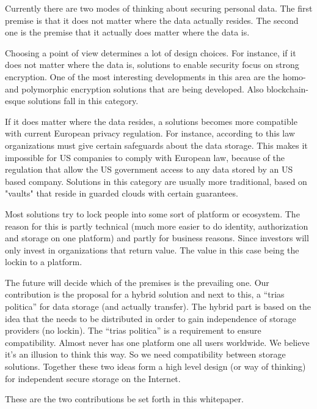 \documentclass{article}
\begin{document}
Currently there are two modes of thinking about securing personal data. The first
premise is that it does not matter where the data actually resides. The second one
is the premise that it actually does matter where the data is.

Choosing a point of view determines a lot of design choices. For instance, if it
does not matter where the data is, solutions to enable security focus on strong
encryption. One of the most interesting developments in this area are the homo- and
polymorphic encryption solutions that are being developed. Also blockchain-esque solutions fall in this category.

If it does matter where the data resides, a solutions becomes more compatible with
current European privacy regulation. For instance, according to this law organizations must give certain safeguards about the data storage. This makes it impossible for US companies to comply with European law, because of the regulation that allow the US government access to any data stored by an US based company. Solutions in this category are usually more traditional, based on "vaults" that reside in guarded clouds with
certain guarantees.

Most solutions try to lock people into some sort of platform or ecosystem. The reason for this is partly technical (much more easier to do identity, authorization and storage on one platform) and partly for business reasons. Since investors will only invest in organizations that return value. The value in this case being the lockin to a platform.

The future will decide which of the premises is the prevailing one. Our contribution
is the proposal for a hybrid solution and next to this, a ``trias politica'' for data
storage (and actually transfer). The hybrid part is based on the idea that the needs
to be distributed in order to gain independence of storage providers (no lockin). The ``trias politica'' is a requirement to ensure compatibility. Almost never has one platform one all users worldwide. We believe it's an illusion to think this way. So we need compatibility between storage solutions. Together these two ideas form a high level design (or way of thinking) for independent secure storage on the Internet.

These are the two contributions be set forth in this whitepaper.





\end{document}
